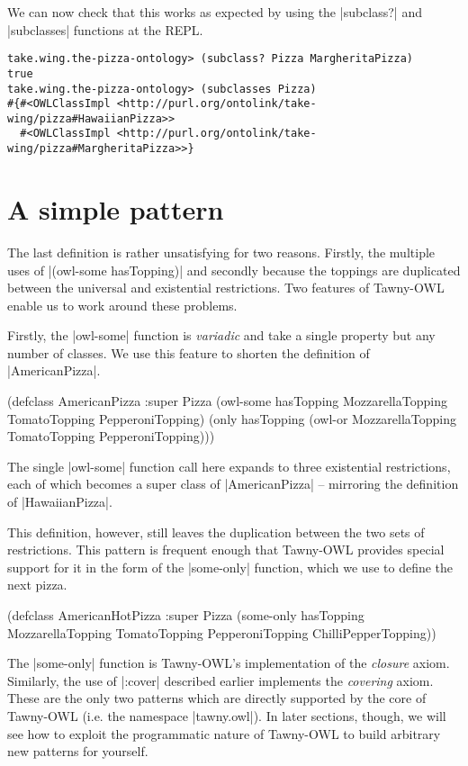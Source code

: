 We can now check that this works as expected by using the |subclass?| and
|subclasses| functions at the REPL.

\begin{verbatim}
take.wing.the-pizza-ontology> (subclass? Pizza MargheritaPizza)
true
take.wing.the-pizza-ontology> (subclasses Pizza)
#{#<OWLClassImpl <http://purl.org/ontolink/take-wing/pizza#HawaiianPizza>>
  #<OWLClassImpl <http://purl.org/ontolink/take-wing/pizza#MargheritaPizza>>}
\end{verbatim}

\section{A simple pattern}
\label{sec:simple-pattern}

The last definition is rather unsatisfying for two reasons. Firstly, the
multiple uses of |(owl-some hasTopping)| and secondly because the toppings are
duplicated between the universal and existential restrictions. Two features of
Tawny-OWL enable us to work around these problems. 

Firstly, the |owl-some| function is \emph{variadic} and take a single property but any
number of classes. We use this feature to shorten the definition of
|AmericanPizza|. 

\begin{tawny}
(defclass AmericanPizza
  :super
  Pizza
  (owl-some hasTopping MozzarellaTopping
            TomatoTopping PepperoniTopping)
  (only hasTopping (owl-or MozzarellaTopping TomatoTopping PepperoniTopping)))
\end{tawny}

The single |owl-some| function call here expands to three existential
restrictions, each of which becomes a super class of |AmericanPizza| --
mirroring the definition of |HawaiianPizza|.

This definition, however, still leaves the duplication between the two sets of
restrictions. This pattern is frequent enough that Tawny-OWL provides special
support for it in the form of the |some-only| function, which we use to define
the next pizza.

\begin{tawny}
(defclass AmericanHotPizza
  :super
  Pizza
  (some-only hasTopping MozzarellaTopping TomatoTopping
             PepperoniTopping ChilliPepperTopping))
\end{tawny}

The |some-only| function is Tawny-OWL's implementation of the \emph{closure} axiom.
Similarly, the use of |:cover| described earlier implements the \emph{covering}
axiom. These are the only two patterns which are directly supported by the
core of Tawny-OWL (i.e. the namespace |tawny.owl|). In later sections, though,
we will see how to exploit the programmatic nature of Tawny-OWL to build
arbitrary new patterns for yourself.


